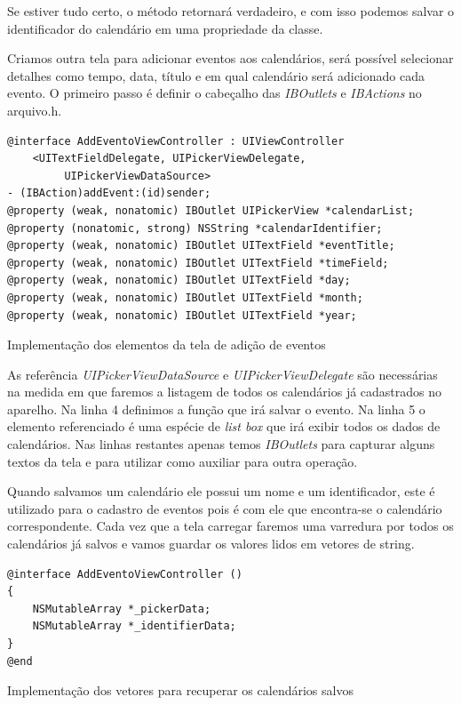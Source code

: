\documentclass[a4paper,12pt,brazil,oneside]{book}
\begin{document}
Se estiver tudo certo, o método retornará verdadeiro, e com isso podemos salvar o identificador do calendário em uma propriedade da classe.

Criamos outra tela para adicionar eventos aos calendários, será possível selecionar detalhes como tempo, data, título e em qual calendário será adicionado cada evento.
O primeiro passo é definir o cabeçalho das \emph{IBOutlets} e \emph{IBActions} no arquivo.h.

\begin{listing}[H]
\begin{verbatim}
@interface AddEventoViewController : UIViewController 
	<UITextFieldDelegate, UIPickerViewDelegate,
		 UIPickerViewDataSource>
- (IBAction)addEvent:(id)sender;
@property (weak, nonatomic) IBOutlet UIPickerView *calendarList;
@property (nonatomic, strong) NSString *calendarIdentifier;
@property (weak, nonatomic) IBOutlet UITextField *eventTitle;
@property (weak, nonatomic) IBOutlet UITextField *timeField;
@property (weak, nonatomic) IBOutlet UITextField *day;
@property (weak, nonatomic) IBOutlet UITextField *month;
@property (weak, nonatomic) IBOutlet UITextField *year;
\end{verbatim}
\caption{Implementação dos elementos da tela de adição de eventos}
\end{listing}

As referência \emph{UIPickerViewDataSource} e \emph{UIPickerViewDelegate} são necessárias na medida em que faremos a listagem de todos os calendários já cadastrados no aparelho. Na linha 4 definimos a função que irá salvar o evento. Na linha 5 o elemento referenciado é uma espécie de \emph{list box} que irá exibir todos os dados de calendários.
Nas linhas restantes apenas temos \emph{IBOutlets} para capturar alguns textos da tela e para utilizar como  auxiliar para outra operação.

Quando salvamos um calendário ele possui um nome e um identificador, este é utilizado para o cadastro de eventos pois é com ele que encontra-se o calendário correspondente. Cada vez que a tela carregar faremos uma varredura por todos os calendários já salvos e vamos guardar os valores lidos em vetores de string.

\begin{listing}[H]
\begin{verbatim}
@interface AddEventoViewController ()
{
    NSMutableArray *_pickerData;
    NSMutableArray *_identifierData;
}
@end
\end{verbatim}
\caption{Implementação dos vetores para recuperar os calendários salvos}
\end{listing}
\end{document}
